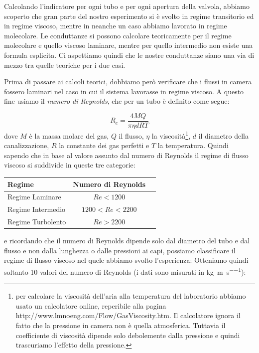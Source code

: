 Calcolando l'indicatore per ogni tubo e per ogni apertura della valvola, abbiamo scoperto che gran parte
del nostro esperimento si è svolto in regime transitorio ed in regime viscoso, mentre in neanche un caso abbiamo
lavorato in regime molecolare. Le conduttanze si possono calcolare teoricamente per il regime molecolare e quello
viscoso laminare, mentre per quello intermedio non esiste una formula esplicita. Ci aspettiamo quindi che le nostre
conduttanze siano una via di mezzo tra quelle teoriche per i due casi.

Prima di passare ai calcoli teorici, dobbiamo però verificare che i flussi in camera fossero laminari nel
caso in cui il sistema lavorasse in regime viscoso. %
A questo fine usiamo il \emph{numero di Reynolds}, che per un tubo è definito come segue:

\begin{equation}
    R_e = \frac{4 M Q}{\pi \eta d R T}
\end{equation}
%
dove $M$ è la massa molare del gas, $Q$ il flusso, $\eta$ la viscosità\footnote{ per calcolare la viscosità dell'aria
alla temperatura del laboratorio abbiamo usato un calcolatore online, reperibile alla pagina http://www.lmnoeng.com/Flow/GasViscosity.htm.
Il calcolatore ignora il fatto che la pressione in camera non è quella atmosferica. Tuttavia il coefficiente di viscosità
dipende solo debolemente dalla pressione e quindi trascuriamo l'effetto della pressione.},
$d$ il diametro della canalizzazione, $R$ la constante dei gas perfetti e $T$ la temperatura.
Quindi sapendo che in base al valore assunto dal numero di Reynolds il regime di flusso viscoso si suddivide in queste tre categorie:

\begin{center}
    \begin{tabular}{l c c}
        \toprule
        Regime & Numero di Reynolds \\
        \midrule
        Regime Laminare & $Re < 1200$ \\
        Regime Intermedio & $1200 < Re < 2200$ \\
        Regime Turbolento & $Re > 2200$ \\
        \bottomrule
    \end{tabular}
\end{center}

e ricordando che il numero di Reynolds dipende solo dal diametro del tubo e dal flusso e non dalla lunghezza o dalle pressioni ai capi, possiamo classificare il regime di flusso viscoso nel quele abbiamo svolto l'esperienza:
Otteniamo quindi soltanto 10 valori del numero di Reynolds (i dati sono misurati in \si{\kg\per\m\per\s}):

